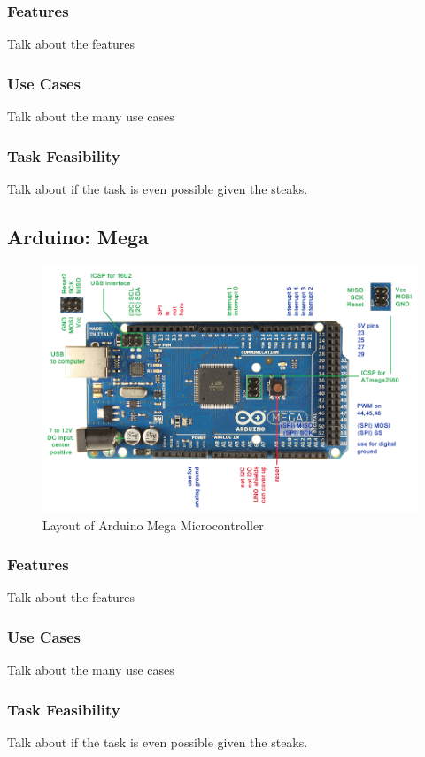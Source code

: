 \documentclass[conference,12pt, ]{IEEEtran}
\begin{document}
\subsubsection{Features}
Talk about the features
\subsubsection{Use Cases}
Talk about the many use cases
\subsubsection{Task Feasibility}
Talk about if the task is even possible given the steaks.


\subsection{Arduino: Mega}
\begin{figure}
	\includegraphics[scale=0.25]{mega.png}
	\caption {Layout of Arduino Mega  Microcontroller}
\end{figure}
\subsubsection{Features}
Talk about the features
\subsubsection{Use Cases}
Talk about the many use cases
\subsubsection{Task Feasibility}
Talk about if the task is even possible given the steaks.
\end{document}
